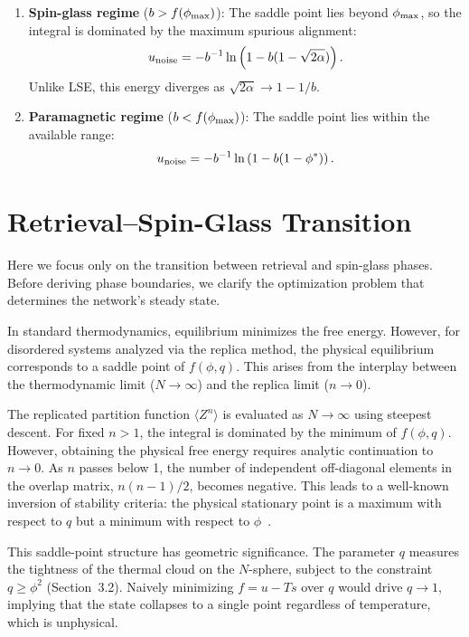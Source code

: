 \documentclass{article}
\theoremstyle{plain}
\theoremstyle{definition}
\theoremstyle{remark}
\begin{document}
\begin{enumerate}
    \item \textbf{Spin-glass regime} ($b > f(\phi_{\rm max})$): The saddle point lies beyond $\phi_{\rm max}$, so the integral is dominated by the maximum spurious alignment:
    \begin{equation}
        u_{\rm noise} = -b^{-1} \ln \left( 1 - b(1 - \sqrt{2\alpha}) \right).
    \end{equation}
    Unlike LSE, this energy diverges as $\sqrt{2\alpha} \to 1 - 1/b$.
    
    \item \textbf{Paramagnetic regime} ($b < f(\phi_{\rm max})$): The saddle point lies within the available range:
    \begin{equation}
        u_{\rm noise} = -b^{-1} \ln \left( 1 - b(1 - \phi^*) \right).
    \end{equation}
\end{enumerate}


\section{Retrieval–Spin-Glass Transition}

Here we focus only on the transition between retrieval and spin-glass phases. Before deriving phase boundaries, we clarify the optimization problem that determines the network's steady state.

In standard thermodynamics, equilibrium minimizes the free energy. However, for disordered systems analyzed via the replica method, the physical equilibrium corresponds to a saddle point of $f(\phi, q)$. This arises from the interplay between the thermodynamic limit ($N \to \infty$) and the replica limit ($n \to 0$).

The replicated partition function $\langle Z^n \rangle$ is evaluated as $N \to \infty$ using steepest descent. For fixed $n > 1$, the integral is dominated by the minimum of $f(\phi, q)$. However, obtaining the physical free energy requires analytic continuation to $n \to 0$. As $n$ passes below 1, the number of independent off-diagonal elements in the overlap matrix, $n(n-1)/2$, becomes negative. This leads to a well-known inversion of stability criteria: the physical stationary point is a maximum with respect to $q$ but a minimum with respect to $\phi$~\citep{Almeida_1978}.

This saddle-point structure has geometric significance. The parameter $q$ measures the tightness of the thermal cloud on the $N$-sphere, subject to the constraint $q \ge \phi^2$ (Section~3.2). Naively minimizing $f = u - Ts$ over $q$ would drive $q \to 1$, implying that the state collapses to a single point regardless of temperature, which is unphysical.
\end{document}
